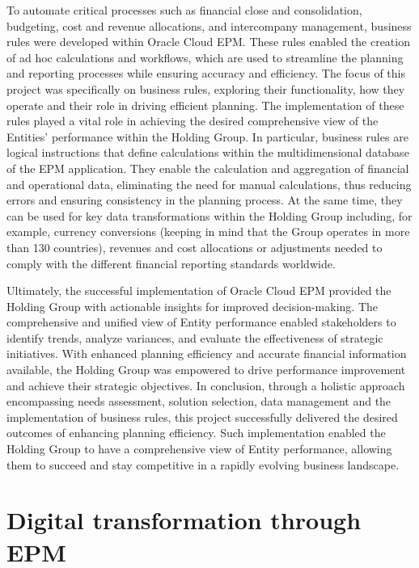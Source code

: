 \documentclass[12pt,a4paper,openright,twoside]{book}
\begin{document}
To automate critical processes such as financial close and consolidation, budgeting, cost and revenue allocations, and intercompany management, business rules were developed within Oracle Cloud EPM. 
%
These rules enabled the creation of ad hoc calculations and workflows, which are used to streamline the planning and reporting processes while ensuring accuracy and efficiency.
%
The focus of this project was specifically on business rules, exploring their functionality, how they operate and their role in driving efficient planning. 
%
The implementation of these rules played a vital role in achieving the desired comprehensive view of the Entities' performance within the Holding Group.
%
In particular, business rules are logical instructions that define calculations within the multidimensional database of the EPM application. 
%
They enable the calculation and aggregation of financial and operational data, eliminating the need for manual calculations, thus reducing errors and ensuring consistency in the planning process.
%
At the same time, they can be used for key data transformations within the Holding Group including, for example, currency conversions (keeping in mind that the Group operates in more than 130 countries), revenues and cost allocations or adjustments needed to comply with the different financial reporting standards worldwide. 

Ultimately, the successful implementation of Oracle Cloud EPM provided the Holding Group with actionable insights for improved decision-making. 
%
The comprehensive and unified view of Entity performance enabled stakeholders to identify trends, analyze variances, and evaluate the effectiveness of strategic initiatives. 
%
With enhanced planning efficiency and accurate financial information available, the Holding Group was empowered to drive performance improvement and achieve their strategic objectives.
%
In conclusion, through a holistic approach encompassing needs assessment, solution selection, data management and the implementation of business rules, this project successfully delivered the desired outcomes of enhancing planning efficiency.
%
Such implementation enabled the Holding Group to have a comprehensive view of Entity performance, allowing them to succeed and stay competitive in a rapidly evolving business landscape.

\section{Digital transformation through EPM}
\end{document}
